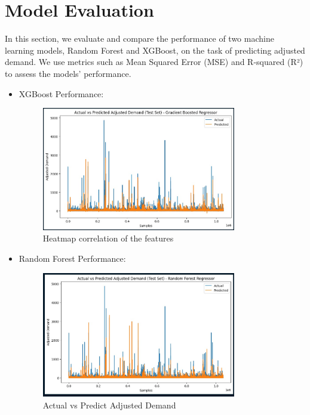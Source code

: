 \documentclass{article}
\begin{document}
\section{Model Evaluation}
In this section, we evaluate and compare the performance of two machine learning models, Random Forest and XGBoost, on the task of predicting adjusted demand. We use metrics such as Mean Squared Error (MSE) and R-squared (R²) to assess the models' performance.
\begin{itemize}
    \item XGBoost Performance:
  
    \begin{figure}[H] 
        \begin{center}
        \centering
        \includegraphics[width=0.8\textwidth]{images/comparisonxg.jpg}
        \caption{Heatmap correlation of the features}
        \end{center}
    \end{figure} 

    \item Random Forest Performance:
    
    \begin{figure}[H] 
        \begin{center}
        \centering
        \includegraphics[width=0.8\textwidth]{images/comparison.jpg}
        \caption{Actual vs Predict Adjusted Demand}
        \end{center}
    \end{figure} 

\end{itemize}
\end{document}
